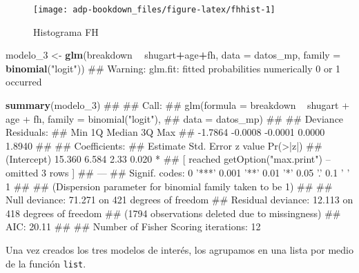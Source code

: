 \documentclass[]{book}
\newenvironment{Shaded}{\begin{snugshade}}{\end{snugshade}}
\newcommand{\KeywordTok}[1]{\textcolor[rgb]{0.13,0.29,0.53}{\textbf{#1}}}
\newcommand{\DataTypeTok}[1]{\textcolor[rgb]{0.13,0.29,0.53}{#1}}
\newcommand{\DecValTok}[1]{\textcolor[rgb]{0.00,0.00,0.81}{#1}}
\newcommand{\StringTok}[1]{\textcolor[rgb]{0.31,0.60,0.02}{#1}}
\newcommand{\OperatorTok}[1]{\textcolor[rgb]{0.81,0.36,0.00}{\textbf{#1}}}
\newcommand{\NormalTok}[1]{#1}
\begin{document}
\begin{figure}

{\centering \texttt{[image: adp-bookdown\_files/figure-latex/fhhist-1]} 

}

\caption{Histograma FH}\label{fig:fhhist}
\end{figure}

\begin{Shaded}
\begin{Highlighting}[]
\NormalTok{modelo_}\DecValTok{3}\NormalTok{ <-}\StringTok{ }\KeywordTok{glm}\NormalTok{(breakdown }\OperatorTok{~}\StringTok{ }\NormalTok{shugart}\OperatorTok{+}\NormalTok{age}\OperatorTok{+}\NormalTok{fh, }
                \DataTypeTok{data   =}\NormalTok{ datos_mp,}
                \DataTypeTok{family =} \KeywordTok{binomial}\NormalTok{(}\StringTok{"logit"}\NormalTok{))}
\NormalTok{## Warning: glm.fit: fitted probabilities numerically 0 or 1 occurred}
\end{Highlighting}
\end{Shaded}

\begin{Shaded}
\begin{Highlighting}[]
\KeywordTok{summary}\NormalTok{(modelo_}\DecValTok{3}\NormalTok{)}
\NormalTok{## }
\NormalTok{## Call:}
\NormalTok{## glm(formula = breakdown ~ shugart + age + fh, family = binomial("logit"), }
\NormalTok{##     data = datos_mp)}
\NormalTok{## }
\NormalTok{## Deviance Residuals: }
\NormalTok{##     Min       1Q   Median       3Q      Max  }
\NormalTok{## -1.7864  -0.0008  -0.0001   0.0000   1.8940  }
\NormalTok{## }
\NormalTok{## Coefficients:}
\NormalTok{##             Estimate Std. Error z value Pr(>|z|)  }
\NormalTok{## (Intercept)   15.360      6.584    2.33    0.020 *}
\NormalTok{##  [ reached getOption("max.print") -- omitted 3 rows ]}
\NormalTok{## ---}
\NormalTok{## Signif. codes:  0 '***' 0.001 '**' 0.01 '*' 0.05 '.' 0.1 ' ' 1}
\NormalTok{## }
\NormalTok{## (Dispersion parameter for binomial family taken to be 1)}
\NormalTok{## }
\NormalTok{##     Null deviance: 71.271  on 421  degrees of freedom}
\NormalTok{## Residual deviance: 12.113  on 418  degrees of freedom}
\NormalTok{##   (1794 observations deleted due to missingness)}
\NormalTok{## AIC: 20.11}
\NormalTok{## }
\NormalTok{## Number of Fisher Scoring iterations: 12}
\end{Highlighting}
\end{Shaded}

Una vez creados los tres modelos de interés, los agrupamos en una lista
por medio de la función \texttt{list}.
\end{document}
